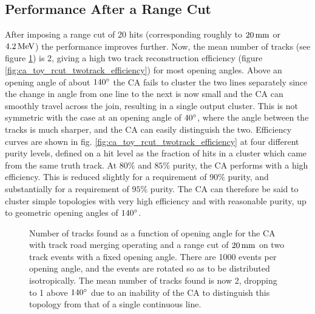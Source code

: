 \subsection{Performance After a Range Cut}
After imposing a range cut of 20 hits (corresponding roughly to $20\,\mathrm{mm}$ or $4.2\,\mathrm{MeV}$) the performance improves further. Now, the mean number of tracks (see figure \ref{fig:ca_toy_rcut_trackcounts}) is 2, giving a high two track reconstruction efficiency (figure \ref{fig:ca_toy_rcut_twotrack_efficiency}) for most opening angles. Above an opening angle of about $140^\circ$ the \ac{CA} fails to cluster the two lines separately since the change in angle from one line to the next is now small and the \ac{CA} can smoothly travel across the join, resulting in a single output cluster. This is not symmetric with the case at an opening angle of $40^\circ$, where the angle between the tracks is much sharper, and the \ac{CA} can easily distinguish the two. Efficiency curves are shown in fig. \ref{fig:ca_toy_rcut_twotrack_efficiency} at four different purity levels, defined on a hit level as the fraction of hits in a cluster which came from the same truth track. At $80\%$ and $85\%$ purity, the \ac{CA} performs with a high efficiency. This is reduced slightly for a requirement of $90\%$ purity, and substantially for a requirement of $95\%$ purity. The \ac{CA} can therefore be said to cluster simple topologies with very high efficiency and with reasonable purity, up to geometric opening angles of $140^\circ$.

\begin{figure}
\centering
{}
\caption[Track count as a function of angle for CA with merging and range cut operating on toy MC events]{\label{fig:ca_toy_rcut_trackcounts}Number of tracks found as a function of opening angle for the \ac{CA} with track road merging operating and a range cut of $20\,\mathrm{mm}$ on two track events with a fixed opening angle. There are 1000 events per opening angle, and the events are rotated so as to be distributed isotropically. The mean number of tracks found is now 2, dropping to 1 above $140^\circ$ due to an inability of the \ac{CA} to distinguish this topology from that of a single continuous line.}
\end{figure}

